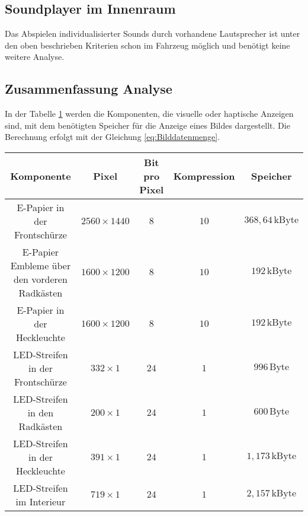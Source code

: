\subsection{Soundplayer im Innenraum}
Das Abspielen individualisierter Sounds durch vorhandene Lautsprecher ist unter den oben beschrieben Kriterien schon im Fahrzeug möglich und benötigt keine weitere Analyse.
\subsection{Zusammenfassung Analyse} \label{ZusammendassungAnalyse}
In der Tabelle \ref{tab:Speicherbedarf} werden die Komponenten, die visuelle oder haptische Anzeigen sind, mit dem benötigten Speicher für die Anzeige eines Bildes dargestellt. Die Berechnung erfolgt mit der Gleichung \ref{eq:Bilddatenmenge}.
\begin{table}[hbt]	
	\centering
	\renewcommand{\arraystretch}{1.5}	%
	\label{tab:Speicherbedarf}
	\begin{tabular}{c|cccc}
		\textbf{Komponente} & \parbox[t]{0.1\linewidth}{\centering Pixel} & \parbox[t]{0.11\linewidth}{\centering Bit pro Pixel} & \parbox[t]{0.15\linewidth}{\centering Kompression} & \parbox[t]{0.1\linewidth}{\centering Speicher} \\ 
		\hline 
		\hline 
		\parbox[t]{0.3\linewidth}{\centering E-Papier in der Frontschürze} & $ 2560 \times 1440 $ & $ 8 $ & $ 10 $ & $ 368,64\,\mathrm{kByte} $\\ \parbox[t]{0.3\linewidth}{\centering E-Papier Embleme über\\den vorderen Radkästen} & $ 1600 \times 1200 $ & $ 8 $ & $ 10 $ & $ 192\,\mathrm{kByte} $ \\
		\parbox[t]{0.3\linewidth}{\centering E-Papier in der Heckleuchte} & $ 1600 \times 1200 $ & $ 8 $ & $ 10 $ & $ 192\,\mathrm{kByte} $ \\
		\parbox[t]{0.3\linewidth}{\centering LED-Streifen in der Frontschürze} & $ 332 \times 1 $ & $ 24 $ & $ 1 $ & $ 996\,\mathrm{Byte} $ \\
		\parbox[t]{0.3\linewidth}{\centering LED-Streifen in den Radkästen} & $ 200 \times 1 $ & $ 24 $ & $ 1 $ & $ 600\,\mathrm{Byte} $\\ \parbox[t]{0.3\linewidth}{\centering LED-Streifen in der Heckleuchte} & $ 391 \times 1 $ & $ 24 $ & $ 1 $ & $ 1,173\,\mathrm{kByte} $ \\ 
		\parbox[t]{0.3\linewidth}{\centering LED-Streifen im Interieur} & $ 719 \times 1 $ & $ 24 $ & $ 1 $ & $ 2,157\,\mathrm{kByte} $ \\

\end{tabular}
\end{table}

